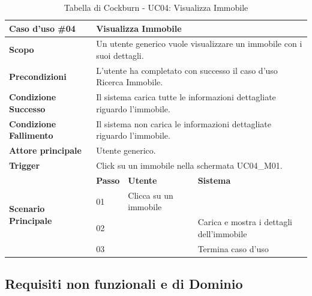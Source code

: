 \documentclass{article}
\begin{document}
\clearpage














\begin{table}[H]
\centering
\renewcommand{\arraystretch}{1.5}
\begin{tabular}{|p{2.8cm}|p{0.8cm}|p{4.2cm}|p{4.2cm}|}
\hline
\rowcolor[HTML]{010066} 
{\color[HTML]{EFEFEF} \textbf{Caso d'uso \#04}} & \multicolumn{3}{l|}{\color[HTML]{FFFFFF} \textbf{Visualizza Immobile}} \\ \hline
\textbf{Scopo} & \multicolumn{3}{l|}{Un utente generico vuole visualizzare un immobile con i suoi dettagli.} \\ \hline
\textbf{Precondizioni} & \multicolumn{3}{l|}{L'utente ha completato con successo il caso d'uso Ricerca Immobile.} \\ \hline
\textbf{Condizione Successo} & \multicolumn{3}{l|}{Il sistema carica tutte le informazioni dettagliate riguardo l'immobile.} \\ \hline
\textbf{Condizione Fallimento} & \multicolumn{3}{l|}{Il sistema non carica le informazioni dettagliate riguardo l'immobile.} \\ \hline
\textbf{Attore principale} & \multicolumn{3}{l|}{Utente generico.} \\ \hline
\textbf{Trigger} & \multicolumn{3}{l|}{Click su un immobile nella schermata UC04\_M01.} \\ \hline

\multirow{4}{2.8cm}{\textbf{Scenario Principale}} 
   & \textbf{Passo} & \textbf{Utente} & \textbf{Sistema} \\ \cline{2-4}
   & 01 & Clicca su un immobile & \\ \cline{2-4}
   & 02 & & Carica e mostra i dettagli dell'immobile \\ \cline{2-4}
   & 03 & & Termina caso d'uso \\ \hline

\end{tabular}
\caption{Tabella di Cockburn - UC04: Visualizza Immobile}
\end{table}

\clearpage

\newpage

\subsection{Requisiti non funzionali e di Dominio}
\end{document}

